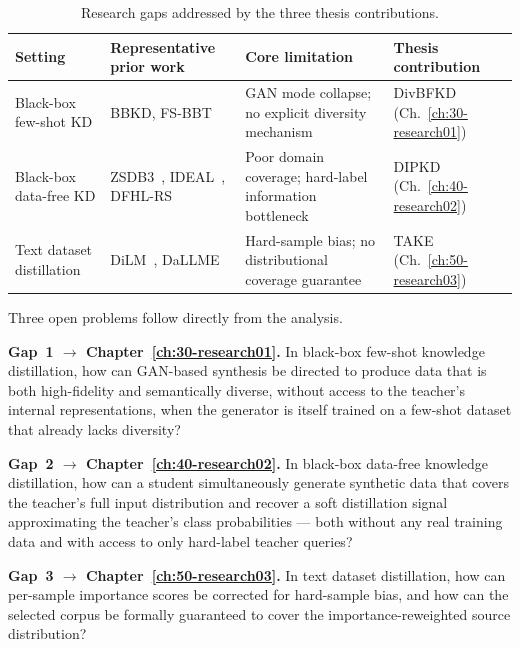 \begin{table}[t]
  \centering
  \caption{Research gaps addressed by the three thesis contributions.}
  \label{tab:research-gaps}
  \begin{tabular}{p{3.2cm}p{3.2cm}p{3.8cm}p{2.8cm}}
    \hline
    \textbf{Setting} & \textbf{Representative prior work} & \textbf{Core limitation} & \textbf{Thesis contribution} \\
    \hline
    Black-box few-shot KD &
    BBKD, FS-BBT &
    GAN mode collapse; no explicit diversity mechanism &
    DivBFKD (Ch.~\ref{ch:30-research01}) \\[4pt]
    Black-box data-free KD &
    ZSDB3~\cite{wang2021zero}, IDEAL~\cite{zhang2022ideal}, DFHL-RS~\cite{yuan2024data} &
    Poor domain coverage; hard-label information bottleneck &
    DIPKD (Ch.~\ref{ch:40-research02}) \\[4pt]
    Text dataset distillation &
    DiLM~\cite{maekawa2024dilm}, DaLLME~\cite{tao2024textual} &
    Hard-sample bias; no distributional coverage guarantee &
    TAKE (Ch.~\ref{ch:50-research03}) \\
    \hline
  \end{tabular}
\end{table}

\begin{foldable}
  Three open problems follow directly from the analysis.
\end{foldable}

\begin{foldable}
  \textbf{Gap~1 $\rightarrow$ Chapter~\ref{ch:30-research01}.}
  In black-box few-shot knowledge distillation, how can GAN-based synthesis be directed to produce data that is both high-fidelity and semantically diverse, without access to the teacher's internal representations, when the generator is itself trained on a few-shot dataset that already lacks diversity?
\end{foldable}

\begin{foldable}
  \textbf{Gap~2 $\rightarrow$ Chapter~\ref{ch:40-research02}.}
  In black-box data-free knowledge distillation, how can a student simultaneously generate synthetic data that covers the teacher's full input distribution and recover a soft distillation signal approximating the teacher's class probabilities --- both without any real training data and with access to only hard-label teacher queries?
\end{foldable}

\begin{foldable}
  \textbf{Gap~3 $\rightarrow$ Chapter~\ref{ch:50-research03}.}
  In text dataset distillation, how can per-sample importance scores be corrected for hard-sample bias, and how can the selected corpus be formally guaranteed to cover the importance-reweighted source distribution?
\end{foldable}

